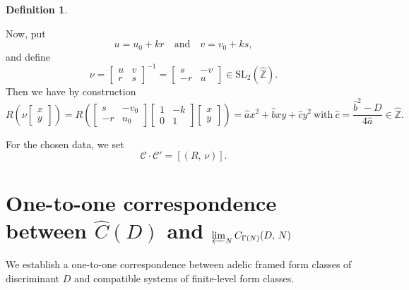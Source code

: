 \documentclass[reqno,11pt]{article}
\theoremstyle{plain} %
\theoremstyle{definition} %
\newtheorem{definition}[theorem]{\indent\sc Definition}
\begin{document}
\begin{definition}
\begin{enumerate}
\begin{equation*}
\end{equation*}
Now, put
\begin{equation*}
u=u_0+kr\quad\textrm{and}\quad
v=v_0+ks,
\end{equation*}
and define
\begin{equation*}
\nu=\begin{bmatrix}u&v\\r&s\end{bmatrix}^{-1}
=\begin{bmatrix}s&-v\\-r&u\end{bmatrix}
\in\mathrm{SL}_2(\widehat{\mathbb{Z}}).
\end{equation*}
Then we have by construction 
\begin{equation*}
R\left(\nu\begin{bmatrix}x\\y\end{bmatrix}\right)=
R\left(\begin{bmatrix}s&-v_0\\-r&u_0\end{bmatrix}\begin{bmatrix}1&-k\\0&1\end{bmatrix}\begin{bmatrix}x\\y\end{bmatrix}
\right)=\widehat{a}x^2
+\widehat{b}xy+\widehat{c}y^2~\textrm{with}~
\widehat{c}=\frac{\widehat{b}^2-D}{4\widehat{a}}
\in\widehat{\mathbb{Z}}.
\end{equation*}
\end{enumerate}
For the chosen data, we set
\begin{equation*}
\mathcal{C}\cdot\mathcal{C}'=[(R,\,\nu)].
\end{equation*}
\end{definition}

\section {One-to-one correspondence between $\widehat{C}(D)$
and $\protect\varprojlim_N C_{\Gamma(N)}(D,\,N)$}\label{onetoone}

We establish a one-to-one correspondence between adelic framed form classes of discriminant $D$
and compatible systems of finite-level form classes.
\end{document}
